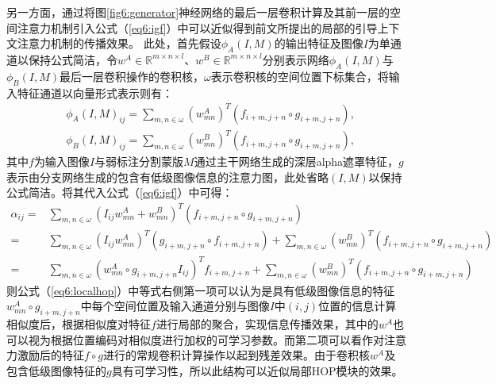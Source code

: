 另一方面，通过将图\ref{fig6:generator}神经网络的最后一层卷积计算及其前一层的空间注意力机制引入公式（\ref{eq6:igf}）中可以近似得到前文所提出的局部的引导上下文注意力机制的传播效果。
此处，首先假设$ \phi_{A}(I, M) $的输出特征及图像$I$为单通道以保持公式简洁，令$w^A\in \mathbb{R}^{m\times n\times l}$、$w^B\in \mathbb{R}^{m\times n\times l}$分别表示网络$ \phi_{A}(I, M) $与$ \phi_{B}(I, M) $最后一层卷积操作的卷积核，$\omega$表示卷积核的空间位置下标集合，将输入特征通道以向量形式表示则有：
\begin{equation}
	\begin{aligned}
	&\phi_{A}(I, M)_{ij} = \sum_{m,n\in \omega} (w^A_{mn})^T(f_{i+m,j+n}\circ g_{i+m,j+n}), \\&\phi_{B}(I, M)_{ij} = \sum_{m,n\in \omega} (w^B_{mn})^T(f_{i+m,j+n}\circ g_{i+m,j+n}),
	\end{aligned}
\end{equation}
其中$f$为输入图像$I$与弱标注分割蒙版$M$通过主干网络生成的深层alpha遮罩特征，$g$表示由分支网络生成的包含有低级图像信息的注意力图，此处省略$(I,M)$以保持公式简洁。将其代入公式（\ref{eq6:igf}）中可得：
\begin{equation}
	\begin{aligned}
	\alpha_{ij} =& \sum_{m,n\in \omega} (I_{ij}w^A_{mn}+w^B_{mn})^T(f_{i+m,j+n}\circ g_{i+m,j+n})\\
	=& \sum_{m,n\in \omega} (I_{ij}w^A_{mn})^T(g_{i+m,j+n}\circ f_{i+m,j+n}) + \sum_{m,n\in \omega} (w^B_{mn})^T(f_{i+m,j+n}\circ g_{i+m,j+n})\\
	=& \sum_{m,n\in \omega} (w^A_{mn}\circ g_{i+m,j+n}I_{ij})^Tf_{i+m,j+n} + \sum_{m,n\in \omega} (w^B_{mn})^T(f_{i+m,j+n}\circ g_{i+m,j+n})
	\end{aligned}
	\label{eq6:localhop}
\end{equation}
则公式（\ref{eq6:localhop}）中等式右侧第一项可以认为是具有低级图像信息的特征$w^A_{mn}\circ g_{i+m,j+n}$中每个空间位置及输入通道分别与图像$I$中$(i,j)$位置的信息计算相似度后，根据相似度对特征$f$进行局部的聚合，实现信息传播效果，其中的$w^A$也可以视为根据位置编码对相似度进行加权的可学习参数。而第二项可以看作对注意力激励后的特征$f\circ g$进行的常规卷积计算操作以起到残差效果。由于卷积核$w^A$及包含低级图像特征的$g$具有可学习性，所以此结构可以近似局部HOP模块的效果。

